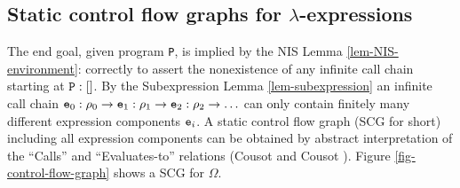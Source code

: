 \documentclass{LMCS}
\theoremstyle{definition}\newtheorem{env}[thm]{Environment}
\begin{document}
\subsection{Static control flow graphs for $\lambda$-expressions} 
\label{sec-abstract-interpretation-for-cfg}

The end goal, given program {\tt P}, is implied by the NIS Lemma 
\ref{lem-NIS-environment}:
correctly to assert the 
nonexistence of any infinite call chain starting at ${\tt P}:[]$.
By  the Subexpression Lemma 
\ref{lem-subexpression} an  infinite  call chain 
${\tt e}_0:\rho_0\to{\tt e}_1:\rho_1\to{\tt 
e}_2:\rho_2\to \ldots$
can only contain  
finitely many different expression components ${\tt e}_i$.
A static control flow graph (SCG for short) including all expression components can be
obtained by abstract interpretation
 of the ``Calls'' and  ``Evaluates-to'' relations
  (Cousot and Cousot  \cite{CousotCousot}). 
  Figure \ref{fig-control-flow-graph} shows a SCG for $\Omega$.
  
\end{document}
